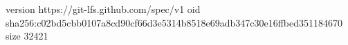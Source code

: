 version https://git-lfs.github.com/spec/v1
oid sha256:c02bd5cbb0107a8cd90cf66d3e5314b8518e69adb347c30e16ffbed351184670
size 32421
